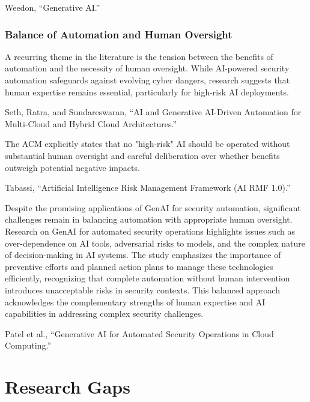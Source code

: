 Weedon, “Generative AI.”


\subsubsection{Balance of Automation and Human Oversight} %
\label{sec:Balance of Automation and Human Oversight}

A recurring theme in the literature is the tension between the benefits of automation and the necessity of human oversight. While AI-powered security automation safeguards against evolving cyber dangers, research suggests that human expertise remains essential, particularly for high-risk AI deployments.

Seth, Ratra, and Sundareswaran, “AI and Generative AI-Driven Automation for Multi-Cloud and Hybrid Cloud Architectures.”

The ACM explicitly states that no "high-risk" AI should be operated without substantial human oversight and careful deliberation over whether benefits outweigh potential negative impacts.

Tabassi, “Artificial Intelligence Risk Management Framework (AI RMF 1.0).”

Despite the promising applications of GenAI for security automation, significant challenges remain in balancing automation with appropriate human oversight. Research on GenAI for automated security operations highlights issues such as over-dependence on AI tools, adversarial risks to models, and the complex nature of decision-making in AI systems.
The study emphasizes the importance of preventive efforts and planned action plans to manage these technologies efficiently, recognizing that complete automation without human intervention introduces unacceptable risks in security contexts. This balanced approach acknowledges the complementary strengths of human expertise and AI capabilities in addressing complex security challenges.

Patel et al., “Generative AI for Automated Security Operations in Cloud Computing.”



\section{Research Gaps} %
\label{sec:Research Gaps}

